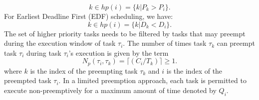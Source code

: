 \begin{equation}\label{eqn:fp-hp-tasks}
    k \in hp(i) = \{k | P_{k} > P_{i}\}.
\end{equation}
\noindent
For Earliest Deadline First (EDF) scheduling, we have:
\begin{equation}\label{eqn:edf-hp-tasks}
    k \in hp(i) = \{k | D_{k} < D_{i}\}.
\end{equation}
\noindent
The set of higher priority tasks needs to be filtered by tasks that may preempt during the execution window of task \begin{math}\tau_{i}\end{math}.  The number of times task \begin{math}\tau_{k}\end{math} can preempt task \begin{math}\tau_{i}\end{math} during task \begin{math}\tau_{i}\end{math}'s execution is given by the term
\begin{equation}\label{eqn:num-preemptions}
    N_{p}(\tau_{i},\tau_{k})=\lceil(C_{i}/T_{k})\rceil \geq 1.
\end{equation}
\noindent
where $k$ is the index of the preempting task \begin{math}\tau_{k}\end{math} and $i$ is the index of the preempted task \begin{math}\tau_{i}\end{math}.  In a limited preemption approach, each task is permitted to execute non-preemptively for a maximum amount of time denoted by \begin{math}Q_{i}\end{math}.
%

